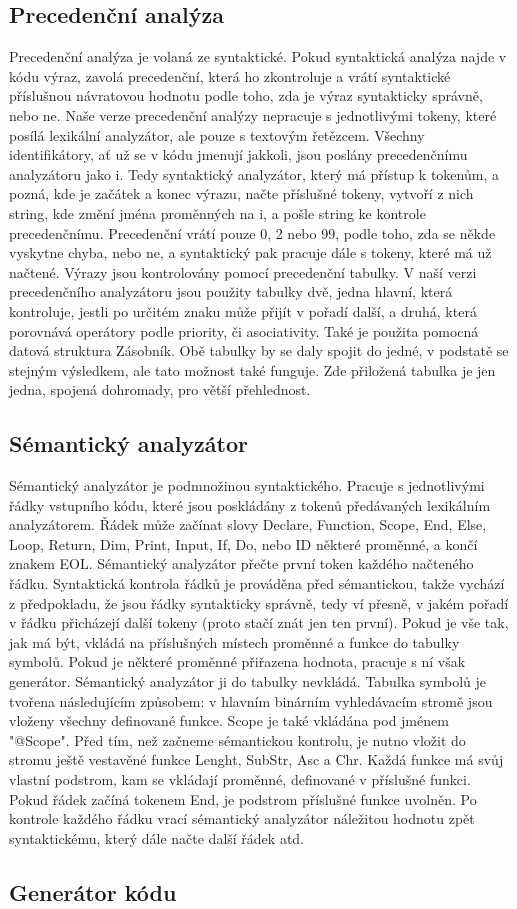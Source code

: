 \documentclass[11pt, a4paper]{article}
\begin{document}
	\subsection{Precedenční analýza}
	Precedenční analýza je volaná ze syntaktické. Pokud syntaktická analýza najde v kódu výraz, zavolá precedenční, která ho zkontroluje a vrátí syntaktické příslušnou návratovou hodnotu podle toho, zda je výraz syntakticky správně, nebo ne.
	Naše verze precedenční analýzy nepracuje s jednotlivými tokeny, které posílá lexikální analyzátor, ale pouze s textovým řetězcem. Všechny identifikátory, ať už se v kódu jmenují jakkoli, jsou poslány precedenčnímu analyzátoru jako i. Tedy syntaktický analyzátor, který má přístup k tokenům, a pozná, kde je začátek a konec výrazu, načte příslušné tokeny, vytvoří z nich string, kde změní jména proměnných na i, a pošle string ke kontrole precedenčnímu. Precedenční vrátí pouze 0, 2 nebo 99, podle toho, zda se někde vyskytne chyba, nebo ne, a syntaktický pak pracuje dále s tokeny, které má už načtené.
	Výrazy jsou kontrolovány pomocí precedenční tabulky. V naší verzi precedenčního analyzátoru jsou použity tabulky dvě, jedna hlavní, která kontroluje, jestli po určitém znaku může přijít v pořadí další, a druhá, která porovnává operátory podle priority, či asociativity. Také je použita pomocná datová struktura Zásobník. Obě tabulky by se daly spojit do jedné, v podstatě se stejným výsledkem, ale tato možnost také funguje. Zde přiložená tabulka je jen jedna, spojená dohromady, pro větší přehlednost.
	\subsection{Sémantický analyzátor}
	Sémantický analyzátor je podmnožinou syntaktického. Pracuje s jednotlivými řádky vstupního kódu, které jsou poskládány z tokenů předávaných lexikálním analyzátorem. Řádek může začínat slovy Declare, Function, Scope, End, Else, Loop, Return, Dim, Print, Input, If, Do, nebo ID některé proměnné, a končí znakem EOL.
	Sémantický analyzátor přečte první token každého načteného řádku. Syntaktická kontrola řádků je prováděna před sémantickou, takže vychází z předpokladu, že jsou řádky syntakticky správně, tedy ví přesně, v jakém pořadí v řádku přicházejí další tokeny (proto stačí znát jen ten první). Pokud je vše tak, jak má být, vkládá na příslušných místech proměnné a funkce do tabulky symbolů. Pokud je některé proměnné přiřazena hodnota, pracuje s ní však generátor. Sémantický analyzátor ji do tabulky nevkládá.
	Tabulka symbolů je tvořena následujícím způsobem: v hlavním binárním vyhledávacím stromě jsou vloženy všechny definované funkce. Scope je také vkládána pod jménem "@Scope". Před tím, než začneme sémantickou kontrolu, je nutno vložit do stromu ještě vestavěné funkce Lenght, SubStr, Asc a Chr. Každá funkce má svůj vlastní podstrom, kam se vkládají proměnné, definované v příslušné funkci. Pokud řádek začíná tokenem End, je podstrom příslušné funkce uvolněn. Po kontrole každého řádku vrací sémantický analyzátor náležitou hodnotu zpět syntaktickému, který dále načte další řádek atd.
	\subsection{Generátor kódu}
\end{document}
